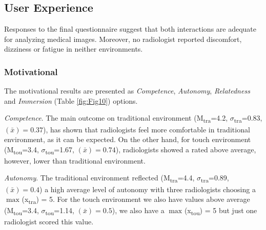 \documentclass{chi-ext}
\begin{document}
\subsection{User Experience}

Responses to the final questionnaire suggest that both interactions are adequate for analyzing medical images. Moreover, no radiologist reported discomfort, dizziness or fatigue in neither environments.

\subsubsection{Motivational}

The motivational results are presented as \textit{Competence}, \textit{Autonomy}, \textit{Relatedness} and \textit{Immersion} (Table \ref{fig:Fig10}) options.

\textit{Competence}. The main outcome on traditional environment (M\textsubscript{tra}=4.2, $\sigma$\textsubscript{tra}=0.83, {}$\left({\bar x}\right)=0.37$), has shown that radiologists feel more comfortable in traditional environment, as it can be expected. On the other hand, for touch environment (M\textsubscript{tou}=3.4, $\sigma$\textsubscript{tou}=1.67, {}$\left({\bar x}\right)=0.74$), radiologists showed a rated above average, however, lower than traditional environment.

\textit{Autonomy}. The traditional environment reflected (M\textsubscript{tra}=4.4, $\sigma$\textsubscript{tra}=0.89, {}$\left({\bar x}\right)=0.4$) a high average level of autonomy with three radiologists choosing a $\max_{}$(x\textsubscript{tra}) = 5. For the touch environment we also have values above average (M\textsubscript{tou}=3.4, $\sigma$\textsubscript{tou}=1.14, {}$\left({\bar x}\right)=0.5$), we also have a $\max_{}$(x\textsubscript{tou}) = 5 but just one radiologist scored this value.
\end{document}
